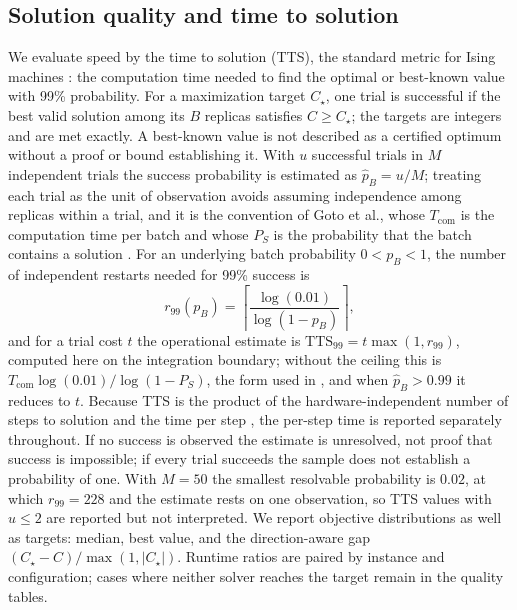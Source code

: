 \documentclass[11pt,a4paper]{article}
\begin{document}
\subsection{Solution quality and time to solution}\label{sec:quality}
We evaluate speed by the time to solution (TTS), the standard metric for Ising machines \cite{ronnow,goto2021}: the computation time needed to find the optimal or best-known value with 99\% probability. For a maximization target $C_\star$, one trial is successful if the best valid solution among its $B$ replicas satisfies $C\ge C_\star$; the targets are integers and are met exactly. A best-known value is not described as a certified optimum without a proof or bound establishing it. With $u$ successful trials in $M$ independent trials the success probability is estimated as $\hat p_B=u/M$; treating each trial as the unit of observation avoids assuming independence among replicas within a trial, and it is the convention of Goto et al., whose $T_{\mathrm{com}}$ is the computation time per batch and whose $P_S$ is the probability that the batch contains a solution \cite{goto2021}. For an underlying batch probability $0<p_B<1$, the number of independent restarts needed for 99\% success is
\begin{equation}
 r_{99}(p_B)=\left\lceil\frac{\log(0.01)}{\log(1-p_B)}\right\rceil,
 \label{eq:restarts}
\end{equation}
and for a trial cost $t$ the operational estimate is $\mathrm{TTS}_{99}=t\max(1,r_{99})$, computed here on the integration boundary; without the ceiling this is $T_{\mathrm{com}}\log(0.01)/\log(1-P_S)$, the form used in \cite{goto2021,tabu2026,zeng2024}, and when $\hat p_B>0.99$ it reduces to $t$. Because TTS is the product of the hardware-independent number of steps to solution and the time per step \cite{kanao2022}, the per-step time is reported separately throughout. If no success is observed the estimate is unresolved, not proof that success is impossible; if every trial succeeds the sample does not establish a probability of one. With $M=50$ the smallest resolvable probability is $0.02$, at which $r_{99}=228$ and the estimate rests on one observation, so TTS values with $u\le 2$ are reported but not interpreted. We report objective distributions as well as targets: median, best value, and the direction-aware gap $(C_\star-C)/\max(1,|C_\star|)$. Runtime ratios are paired by instance and configuration; cases where neither solver reaches the target remain in the quality tables.
\end{document}
